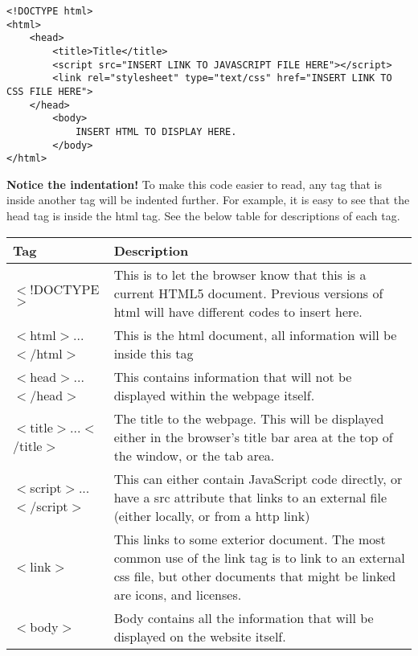 \documentclass[portfolio.tex]{subfiles}
\begin{document}
					\begin{lstlisting}
<!DOCTYPE html>
<html>
	<head>
		<title>Title</title>
		<script src="INSERT LINK TO JAVASCRIPT FILE HERE"></script>
		<link rel="stylesheet" type="text/css" href="INSERT LINK TO CSS FILE HERE">
	</head>
		<body>
			INSERT HTML TO DISPLAY HERE.
		</body>
</html>
					\end{lstlisting}

						\vspace{0.5cm}
						\textbf{Notice the indentation!} To make this code easier to read, any tag that is inside another tag will be indented further. For example, it is easy to see that the head tag is inside the html tag. See the below table for descriptions of each tag.\\

					{\centering
						\begin{tabular}{P{4cm}p{11cm}}
						\toprule
						\large\textbf{Tag} & \large\textbf{Description}\\
						\toprule
						$<$!DOCTYPE$>$ & This is to let the browser know that this is a current HTML5 document. Previous versions of html will have different codes to insert here. \autocite{doctype} \\
						\hline
						$<$html$>$...$<$/html$>$ &  This is the html document, all information will be inside this tag\\
						\hline
						$<$head$>$...$<$/head$>$ &  This contains information that will not be displayed within the webpage itself.\\
						\hline
						$<$title$>$...$<$/title$>$ &  The title to the webpage. This will be displayed either in the browser's title bar area at the top of the window, or the tab area.\\
						\hline
						$<$script$>$...$<$/script$>$ & This can either contain JavaScript code directly, or have a src attribute that links to an external file (either locally, or from a http link) \\
						\hline
						$<$link$>$& This  links to some exterior document. The most common use of the link tag is to link to an external css file, but other documents that might be linked are icons, and licenses. \autocite{w3-link} \\
						\hline
						$<$body$>$& Body contains all the information that will be displayed on the website itself. \\
						\bottomrule
					\end{tabular}
				}
\end{document}

